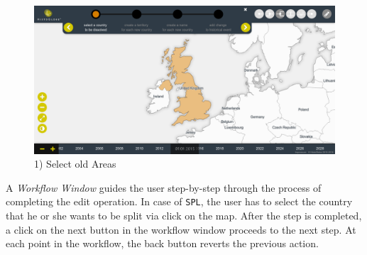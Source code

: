 \vspace{1em}
\begin{minipage}[t]{0.47\textwidth}

  \begin{figure}[H]
    \centering
    \includegraphics[width=1.0\textwidth]{graphics/development/user_interface_design_process/3_select_old_areas.png}
    \caption{1) Select old Areas}
    \label{fig:final_3_select_old_areas}
  \end{figure}

  A \emph{Workflow Window} guides the user step-by-step through the process of completing the edit operation. In case of \texttt{SPL}, the user has to select the country that he or she wants to be split via click on the map. After the step is completed, a click on the next button in the workflow window proceeds to the next step. At each point in the workflow, the back button reverts the previous action.

\end{minipage}    %
\hspace{1.5em}    %
